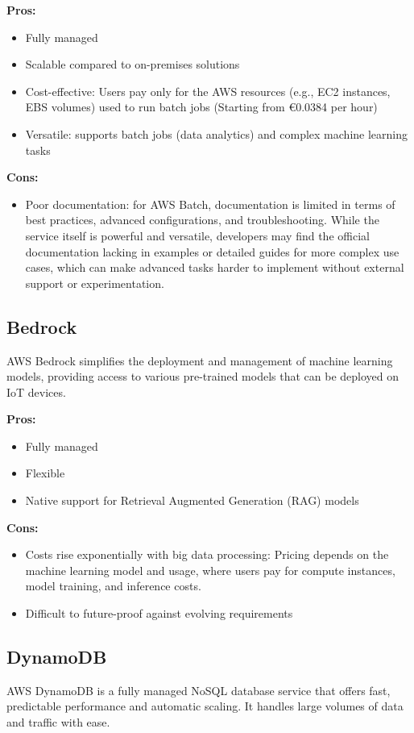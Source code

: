 \textbf{Pros:}
\begin{itemize}
    \item Fully managed
    \item Scalable compared to on-premises solutions
    \item Cost-effective: Users pay only for the AWS resources (e.g., EC2 instances, EBS volumes) used to run batch jobs (Starting from €0.0384 per hour)
    \item Versatile: supports batch jobs (data analytics) and complex machine learning tasks
\end{itemize}

\textbf{Cons:}
\begin{itemize}
    \item Poor documentation: for AWS Batch, documentation is limited in terms of best practices, advanced configurations, and troubleshooting. While the service itself is powerful and versatile, developers may find the official documentation lacking in examples or detailed guides for more complex use cases, which can make advanced tasks harder to implement without external support or experimentation.
\end{itemize}

\subsection*{Bedrock}
\label{aws:bedrock}
AWS Bedrock simplifies the deployment and management of machine learning models, providing access to various pre-trained models that can be deployed on IoT devices.

\textbf{Pros:}
\begin{itemize}
    \item Fully managed
    \item Flexible
    \item Native support for Retrieval Augmented Generation (RAG) models\cite{site:rag}
\end{itemize}

\textbf{Cons:}
\begin{itemize}
    \item Costs rise exponentially with big data processing: Pricing depends on the machine learning model and usage, where users pay for compute instances, model training, and inference costs.
    \item Difficult to future-proof against evolving requirements
\end{itemize}

\subsection*{DynamoDB}
\label{aws:dynamodb}
AWS DynamoDB is a fully managed NoSQL database service that offers fast, predictable performance and automatic scaling. It handles large volumes of data and traffic with ease.

